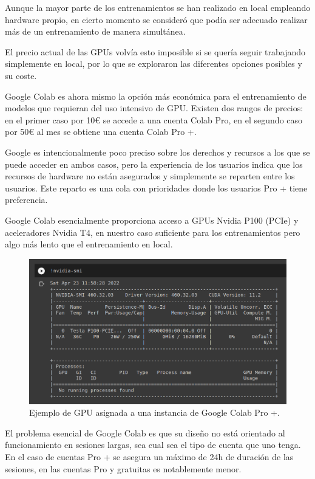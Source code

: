 Aunque la mayor parte de los entrenamientos se han realizado en local empleando hardware propio, en cierto momento se consideró que podía ser adecuado realizar más de un entrenamiento de manera simultánea.

El precio actual de las GPUs volvía esto imposible si se quería seguir trabajando simplemente en local, por lo que se exploraron las diferentes opciones posibles y su coste.

Google Colab es ahora mismo la opción más económica para el entrenamiento de modelos que requieran del uso intensivo de GPU. Existen dos rangos de precios: en el primer caso por 10€ se accede a una cuenta Colab Pro, en el segundo caso por 50€ al mes se obtiene una cuenta Colab Pro +.

Google es intencionalmente poco preciso sobre los derechos y recursos a los que se puede acceder en ambos casos, pero la experiencia de los usuarios indica que los recursos de hardware no están asegurados y simplemente se reparten entre los usuarios. Este reparto es una cola con prioridades donde los usuarios Pro + tiene preferencia.

Google Colab esencialmente proporciona acceso a GPUs Nvidia P100 (PCIe) y aceleradores Nvidia T4, en nuestro caso suficiente para los entrenamientos pero algo más lento que el entrenamiento en local.

\begin{figure}[H]
\centering
\includegraphics[width=14cm]{Z_anexos_img/colab-1.png}
\caption{Ejemplo de GPU asignada a una instancia de Google Colab Pro +.}
\label{fig:figure1}
\end{figure}

El problema esencial de Google Colab es que su diseño no está orientado al funcionamiento en sesiones largas, sea cual sea el tipo de cuenta que uno tenga. En el caso de cuentas Pro + se asegura un máximo de 24h de duración de las sesiones, en las cuentas Pro y gratuitas es notablemente menor.


